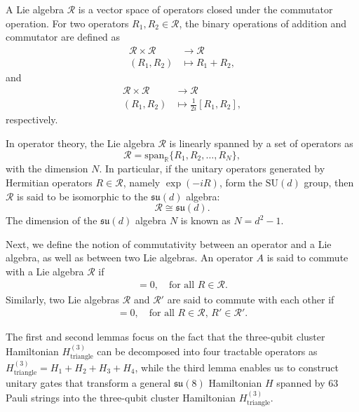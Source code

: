 \documentclass[aps,showpacs,amsmath,amssymb,twocolumn,prx,longbibliography,superscriptaddress,notitlepage,floatfix,10pt]{revtex4-2}
\begin{document}
    A Lie algebra $\mathcal{R}$ is a vector space of operators closed under the commutator operation. 
For two operators $R_{1},R_{2}\in\mathcal{R}$, the binary operations of addition and commutator are defined as
\begin{equation}
    \begin{split}
        \mathcal{R}\times\mathcal{R}&\rightarrow\mathcal{R}\\
        (R_{1},R_{2})&\mapsto R_{1}+R_{2},
    \end{split}
\end{equation}
and
\begin{equation}
    \begin{split}
        \mathcal{R}\times\mathcal{R}&\rightarrow\mathcal{R}\\
        (R_{1},R_{2})&\mapsto \frac{1}{2i}[R_{1},R_{2}],
    \end{split}
\end{equation}
respectively. 

In operator theory, the Lie algebra $\mathcal{R}$ is linearly spanned by a set of operators as
\begin{equation}
    \mathcal{R}=\mathrm{span}_{\mathbb{R}}\{R_{1},R_{2},\dots,R_{N}\},
\end{equation}
with the dimension $N$. In particular, if the unitary operators generated by Hermitian operators $R\in\mathcal{R}$, namely $\exp(-iR)$, form the $\mathrm{SU}(d)$ group, then $\mathcal{R}$ is said to be isomorphic to the $\mathfrak{su}(d)$ algebra:
\begin{equation}
    \mathcal{R}\cong\mathfrak{su}(d).
\end{equation}
The dimension of the $\mathfrak{su}(d)$ algebra $N$ is known as $N=d^{2}-1$.

Next, we define the notion of commutativity between an operator and a Lie algebra, as well as between two Lie algebras. An operator $A$ is said to commute with a Lie algebra $\mathcal{R}$ if
\begin{align}
    [A,R]=0,\quad \text{for all } R\in\mathcal{R}.
\end{align}
Similarly, two Lie algebras $\mathcal{R}$ and $\mathcal{R}'$ are said to commute with each other if
\begin{align}
    [R,R']=0,\quad \text{for all } R\in\mathcal{R},\, R'\in\mathcal{R}'.
\end{align}

The first and second lemmas focus on the fact that the three-qubit cluster Hamiltonian $H_{\mathrm{triangle}}^{(3)}$ can be decomposed into four tractable operators as $H_{\mathrm{triangle}}^{(3)}=H_{1}+H_{2}+H_{3}+H_{4}$, while the third lemma enables us to construct unitary gates that transform a general $\mathfrak{su}(8)$ Hamiltonian $H$ spanned by 63 Pauli strings into the three-qubit cluster Hamiltonian $H_{\mathrm{triangle}}^{(3)}$.
\end{document}
